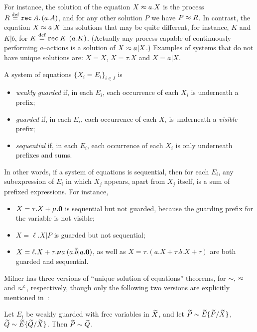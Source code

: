 For instance, the solution of the equation $X \approx a. X$ 
is the process
$R \stackrel{\mbox{\scriptsize def}}{=} {\tt rec}\: A . \, (a. A)$, and for any other solution $P$ we have $P \approx R$.
In contrast, the equation 
 $X \approx a|  X$ has solutions that may be quite different, for instance,
 $K$ and $K | b$, for $K \stackrel{\mbox{\scriptsize def}}{=} {\tt rec}\: K . \, (a. K)$. (Actually any process capable of
continuously performing $a$--actions is a solution of $X \approx a|  X$.)
%
Examples of systems that do not have unique solutions are: $X = X$, $X
= \tau . X$ and $X = a | X$.

\begin{definition}
\label{def:guardness}
A system of equations $\{ X_i = E_i\}_{i\in I}$ is 
\begin{itemize}
\item \emph{weakly guarded} if, in each $E_i$, each occurrence of
  each $X_i$ is underneath a prefix;

\item \emph{guarded} if, in each $E_i$, each occurrence of
  each $X_i$ is underneath a \emph{visible} prefix;

\item \emph{sequential} if, in each $E_i$, each
  occurrence of each $X_i$ is only underneath prefixes and sums.
\end{itemize}
\end{definition}

In other words, if a system of equations is sequential, then for
each  $E_i$, any subexpression of $E_i$ in which $X_j $
appears, apart from $X_j$ itself, is a sum of prefixed expressions.
For instance,
\begin{itemize}
\item $X = \tau. X + \mu . {\boldsymbol 0}$ is sequential but not 
 guarded, because the guarding prefix for the variable
is not visible;
\item $X =  \ell . X | P$ is guarded but not sequential;
\item $X =  \ell . X + \tau. {\boldsymbol \nu} a\: (a .\overline{b} | a.{\boldsymbol 0})$, as well as
$X = \tau . (a. X + \tau . b .X + \tau  )$ are both guarded and sequential.
\end{itemize}

Milner has three versions of  ``unique solution of equations''
theorems, for $\sim$, $\approx$ and $\mathrel{\approx^{\rm{c}}}$, respectively, though only the
following two versions are explicitly mentioned in~\citep[p.~103, 158]{Mil89}:
\begin{theorem}
\label{t:Mil89s1}
Let $E_i$ be weakly guarded with free variables in $\widetilde X$,
and let ${\widetilde P} \sim {\widetilde E}\{\widetilde P /\widetilde X\}$,
  ${\widetilde Q} \sim {\widetilde E}\{\widetilde Q /\widetilde X\}$. Then ${\widetilde P} \sim {\widetilde Q}$.
\end{theorem}

